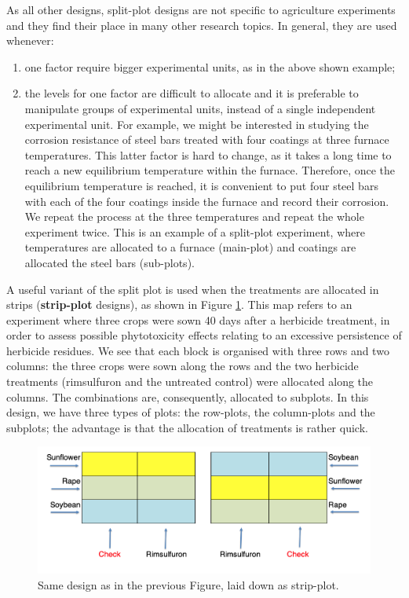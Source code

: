 \documentclass[a4paper,12pt,oneside]{book}
\providecommand{\tightlist}{%
  \setlength{\itemsep}{0pt}\setlength{\parskip}{0pt}}
\begin{document}
As all other designs, split-plot designs are not specific to agriculture experiments and they find their place in many other research topics. In general, they are used whenever:

\begin{enumerate}
\def\labelenumi{\arabic{enumi}.}
\tightlist
\item
  one factor require bigger experimental units, as in the above shown example;
\item
  the levels for one factor are difficult to allocate and it is preferable to manipulate groups of experimental units, instead of a single independent experimental unit. For example, we might be interested in studying the corrosion resistance of steel bars treated with four coatings at three furnace temperatures. This latter factor is hard to change, as it takes a long time to reach a new equilibrium temperature within the furnace. Therefore, once the equilibrium temperature is reached, it is convenient to put four steel bars with each of the four coatings inside the furnace and record their corrosion. We repeat the process at the three temperatures and repeat the whole experiment twice. This is an example of a split-plot experiment, where temperatures are allocated to a furnace (main-plot) and coatings are allocated the steel bars (sub-plots).
\end{enumerate}

A useful variant of the split plot is used when the treatments are allocated in strips (\textbf{strip-plot} designs), as shown in Figure \ref{fig:figName39}. This map refers to an experiment where three crops were sown 40 days after a herbicide treatment, in order to assess possible phytotoxicity effects relating to an excessive persistence of herbicide residues. We see that each block is organised with three rows and two columns: the three crops were sown along the rows and the two herbicide treatments (rimsulfuron and the untreated control) were allocated along the columns. The combinations are, consequently, allocated to subplots. In this design, we have three types of plots: the row-plots, the column-plots and the subplots; the advantage is that the allocation of treatments is rather quick.

\begin{figure}

{\centering \includegraphics[width=0.75\linewidth]{_images/StripPlotEng} 

}

\caption{Same design as in the previous Figure, laid down as strip-plot.}\label{fig:figName39}
\end{figure}
\end{document}
